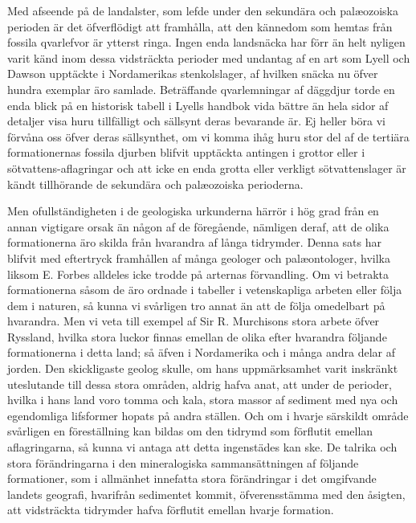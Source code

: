 Med afseende på de landalster, som lefde under den sekundära och palæozoiska perioden är det öfverflödigt att framhålla, att den kännedom som hemtas från fossila qvarlefvor är ytterst ringa. Ingen enda landsnäcka har förr än helt nyligen varit känd inom dessa vidsträckta perioder med undantag af en art som Lyell och Dawson upptäckte i Nordamerikas stenkolslager, af hvilken snäcka nu öfver hundra exemplar äro samlade. Beträffande qvarlemningar af däggdjur torde en enda blick på en historisk tabell i Lyells handbok vida bättre än hela sidor af detaljer visa huru tillfälligt och sällsynt deras bevarande är. Ej heller böra vi förvåna oss öfver deras sällsynthet, om vi komma ihåg huru stor del af de tertiära formationernas fossila djurben blifvit upptäckta antingen i grottor eller i sötvattens-aflagringar och att icke en enda grotta eller verkligt sötvattenslager är kändt tillhörande de sekundära och palæozoiska perioderna.

Men ofullständigheten i de geologiska urkunderna härrör i hög grad från en annan vigtigare orsak än någon af de föregående, nämligen deraf, att de olika formationerna äro skilda från hvarandra af långa tidrymder. Denna sats har blifvit med eftertryck framhållen af många geologer och palæontologer, hvilka liksom E. Forbes alldeles icke trodde på arternas förvandling. Om vi betrakta formationerna såsom de äro ordnade i tabeller i vetenskapliga arbeten eller följa dem i naturen, så kunna vi svårligen tro annat än att de följa omedelbart på hvarandra. Men vi veta till exempel af Sir R. Murchisons stora arbete öfver Ryssland, hvilka stora luckor finnas emellan de olika efter hvarandra följande formationerna i detta land; så äfven i Nordamerika och i många andra delar af jorden. Den skickligaste geolog skulle, om hans uppmärksamhet varit inskränkt uteslutande till dessa stora områden, aldrig hafva anat, att under de perioder, hvilka i hans land voro tomma och kala, stora massor af sediment med nya och egendomliga lifsformer hopats på andra ställen. Och om i hvarje särskildt område svårligen en föreställning kan bildas om den tidrymd som förflutit emellan aflagringarna, så kunna vi antaga att detta ingenstädes kan ske. De talrika och stora förändringarna i den mineralogiska sammansättningen af följande formationer, som i allmänhet innefatta stora förändringar i det omgifvande landets geografi, hvarifrån sedimentet kommit, öfverensstämma med den åsigten, att vidsträckta tidrymder hafva förflutit emellan hvarje formation.

